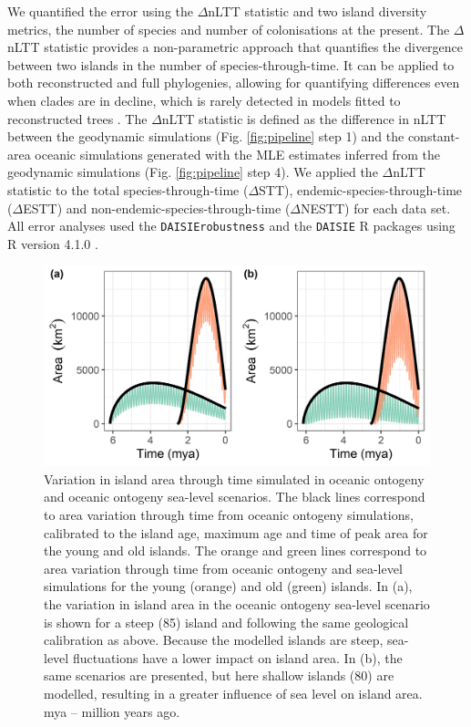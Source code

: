 \documentclass{article}
\begin{document}
We quantified the error using the $\Delta$nLTT statistic \citep{janzen_approximate_2015} and two island diversity metrics, the number of species and number of colonisations at the present. The $\Delta$nLTT statistic provides a non-parametric approach that quantifies the divergence between two islands in the number of species-through-time. It can be applied to both reconstructed and full phylogenies, allowing for quantifying differences even when clades are in decline, which is rarely detected in models fitted to reconstructed trees \citep{burin_how_2019}. The $\Delta$nLTT statistic is defined as the difference in nLTT between the geodynamic simulations (Fig. \ref{fig:pipeline} step 1) and the constant-area oceanic simulations generated with the MLE estimates inferred from the geodynamic simulations (Fig. \ref{fig:pipeline} step 4). We applied the $\Delta$nLTT statistic to the total species-through-time ($\Delta$STT), endemic-species-through-time ($\Delta$ESTT) and non-endemic-species-through-time ($\Delta$NESTT) for each data set. All error analyses used the \texttt{DAISIErobustness} \citep{lambert_joshua_w_2021_5119973}  and the \texttt{DAISIE} \citep{etienne_daisie_2021} R packages using R version 4.1.0 \citep{r_2021}.

\clearpage

\begin{figure}
    \centering
    \includegraphics[width=\textwidth]{area.png}
    \caption{Variation in island area through time simulated in oceanic ontogeny and oceanic ontogeny sea-level scenarios. The black lines correspond to area variation through time from oceanic ontogeny simulations, calibrated to the island age, maximum age and time of peak area for the young and old islands. The orange and green lines correspond to area variation through time from oceanic ontogeny and sea-level simulations for the young (orange) and old (green) islands. In (a), the variation in island area in the oceanic ontogeny sea-level scenario is shown for a steep (85\degree) island and following the same geological calibration as above. Because the modelled islands are steep, sea-level fluctuations have a lower impact on island area. In (b), the same scenarios are presented, but here shallow islands (80\degree) are modelled, resulting in a greater influence of sea level on island area. mya – million years ago.}
    \label{fig:area}
\end{figure}
\end{document}
